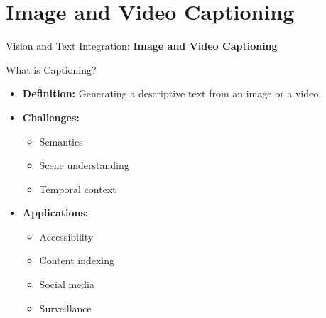 \section{Image and Video Captioning}
\begin{frame}{}
    \LARGE Vision and Text Integration: \textbf{Image and Video Captioning}
\end{frame}

\begin{frame}[allowframebreaks]{What is Captioning?}
    \begin{itemize}
        \item \textbf{Definition:} Generating a descriptive text from an image or a video.
    \end{itemize}
    \begin{figure}
        \centering
    \end{figure}
\framebreak
    \begin{itemize}
        \item \textbf{Challenges:}
        \begin{itemize}
            \item Semantics
            \item Scene understanding
            \item Temporal context
        \end{itemize}
        \item \textbf{Applications:}
        \begin{itemize}
            \item Accessibility
            \item Content indexing
            \item Social media
            \item Surveillance
        \end{itemize}
    \end{itemize}
\end{frame}

